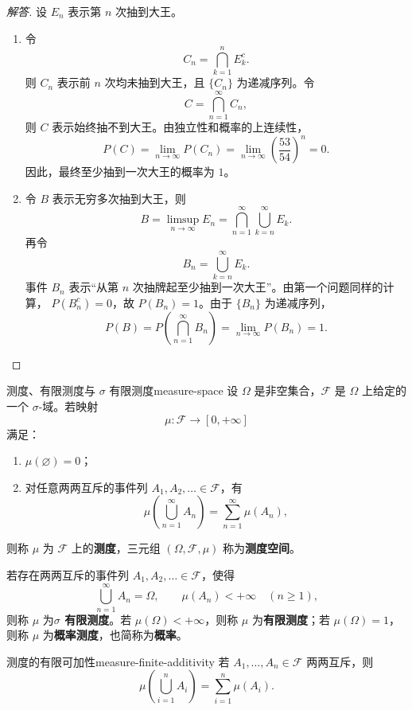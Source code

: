 \begin{proof}[解答]
设 $E_n$ 表示第 $n$ 次抽到大王。

\begin{enumerate}
\item 令
\[
C_n=\bigcap_{k=1}^{n}E_k^c.
\]
则 $C_n$ 表示前 $n$ 次均未抽到大王，且 $\{C_n\}$ 为递减序列。令
\[
C=\bigcap_{n=1}^{\infty}C_n,
\]
则 $C$ 表示始终抽不到大王。由独立性和概率的上连续性，
\[
P(C)=\lim_{n\to\infty}P(C_n)
=\lim_{n\to\infty}\left(\frac{53}{54}\right)^n=0.
\]
因此，最终至少抽到一次大王的概率为 $1$。
\item 令 $B$ 表示无穷多次抽到大王，则
\[
B=\limsup_{n\to\infty}E_n
=\bigcap_{n=1}^{\infty}\bigcup_{k=n}^{\infty}E_k.
\]
再令
\[
B_n=\bigcup_{k=n}^{\infty}E_k.
\]
事件 $B_n$ 表示“从第 $n$ 次抽牌起至少抽到一次大王”。由第一个问题同样的计算，
$P(B_n^c)=0$，故 $P(B_n)=1$。由于 $\{B_n\}$ 为递减序列，
\[
P(B)=P\left(\bigcap_{n=1}^{\infty}B_n\right)
=\lim_{n\to\infty}P(B_n)=1.
\]
\end{enumerate}
\end{proof}

\begin{mydefinition}{测度、有限测度与 $\sigma$ 有限测度}{measure-space}
设 $\Omega$ 是非空集合，$\mathscr{F}$ 是 $\Omega$ 上给定的一个 $\sigma$-域。若映射
\[
\mu:\mathscr{F}\longrightarrow[0,+\infty]
\]
满足：
\begin{enumerate}
\item $\mu(\varnothing)=0$；
\item 对任意两两互斥的事件列 $A_1,A_2,\ldots\in\mathscr{F}$，有
\[
\mu\left(\bigcup_{n=1}^{\infty}A_n\right)
=\sum_{n=1}^{\infty}\mu(A_n),
\]
\end{enumerate}
则称 $\mu$ 为 $\mathscr{F}$ 上的\textbf{测度}，三元组 $(\Omega,\mathscr{F},\mu)$ 称为\textbf{测度空间}。

\end{mydefinition}

若存在两两互斥的事件列 $A_1,A_2,\ldots\in\mathscr{F}$，使得
\[
\bigcup_{n=1}^{\infty}A_n=\Omega,
\qquad
\mu(A_n)<+\infty\quad(n\geq1),
\]
则称 $\mu$ 为\textbf{$\sigma$ 有限测度}。若 $\mu(\Omega)<+\infty$，则称 $\mu$ 为\textbf{有限测度}；若 $\mu(\Omega)=1$，则称 $\mu$ 为\textbf{概率测度}，也简称为\textbf{概率}。

\begin{proposition}{测度的有限可加性}{measure-finite-additivity}
若 $A_1,\ldots,A_n\in\mathscr{F}$ 两两互斥，则
\[
\mu\left(\bigcup_{i=1}^{n}A_i\right)=\sum_{i=1}^{n}\mu(A_i).
\]
\end{proposition}

